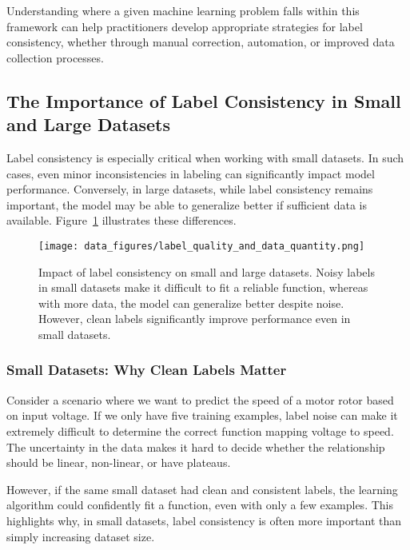 \documentclass[12pt,openany]{book}
\begin{document}
Understanding where a given machine learning problem falls within this framework can help practitioners develop appropriate strategies for label consistency, whether through manual correction, automation, or improved data collection processes.


\subsection{The Importance of Label Consistency in Small and Large Datasets}

Label consistency is especially critical when working with small datasets. In such cases, even minor inconsistencies in labeling can significantly impact model performance. Conversely, in large datasets, while label consistency remains important, the model may be able to generalize better if sufficient data is available. Figure~\ref{fig:label_quality_and_data_quantity} illustrates these differences.

\begin{figure}[H]
    \centering
    \texttt{[image: data\_figures/label\_quality\_and\_data\_quantity.png]}
    \caption{Impact of label consistency on small and large datasets. Noisy labels in small datasets make it difficult to fit a reliable function, whereas with more data, the model can generalize better despite noise. However, clean labels significantly improve performance even in small datasets.}
    \label{fig:label_quality_and_data_quantity}
\end{figure}

\subsubsection{Small Datasets: Why Clean Labels Matter}
Consider a scenario where we want to predict the speed of a motor rotor based on input voltage. If we only have five training examples, label noise can make it extremely difficult to determine the correct function mapping voltage to speed. The uncertainty in the data makes it hard to decide whether the relationship should be linear, non-linear, or have plateaus. \newline

However, if the same small dataset had clean and consistent labels, the learning algorithm could confidently fit a function, even with only a few examples. This highlights why, in small datasets, label consistency is often more important than simply increasing dataset size.
\end{document}
